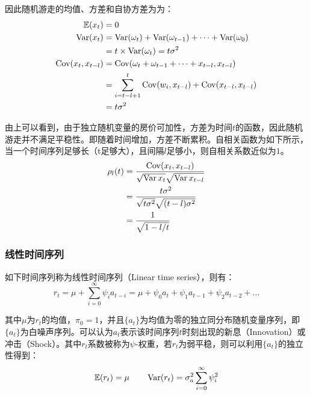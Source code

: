 \documentclass[11pt]{article}
\begin{document}
因此随机游走的均值、方差和自协方差为为：
\begin{align*}
    \mathbb{E}(x_t) &= 0 \\
    \operatorname{Var}(x_t) &= \operatorname{Var}(\omega_{t}) + \operatorname{Var}(\omega_{t-1}) + \dots + \operatorname{Var}(\omega_{0}) \\
    &= t \times \operatorname{Var}(\omega_t) = t \sigma^2 \\
    \operatorname{Cov}(x_t,x_{t-l}) &= \operatorname{Cov}(\omega_{t}+ \omega_{t-1} + \dots + x_{t-l},x_{t-l}) \\
    &= \sum_{i=t-l+1}^{t} \operatorname{Cov}(w_i,x_{t-l}) + \operatorname{Cov}(x_{t-l},x_{t-l}) \\
    &= t\sigma^2
\end{align*}

由上可以看到，由于独立随机变量的房价可加性，方差为时间$t$的函数，因此随机游走并不满足平稳性。即随着时间增加，方差不断累积。自相关函数为如下所示，当一个时间序列足够长（t足够大），且间隔$l$足够小，则自相关系数近似为$1$。
\begin{align*}
    \rho_l(t) &= \frac{\operatorname{Cov}(x_{t},x_{t-l})}{\sqrt{\operatorname{Var}{x_{t}}}\sqrt{\operatorname{Var}{x_{t-l}}}} \\
    &= \frac{t\sigma^2}{\sqrt{t\sigma^2}\sqrt{(t-l)\sigma^2}} \\
    &= \frac{1}{\sqrt{1-l/t}}
\end{align*}

\subsubsection{线性时间序列}

如下时间序列称为线性时间序列（Linear time series），则有：
\begin{equation*}
    r_t = \mu + \sum_{i=0}^{\infty} \psi_i a_{t-i} = \mu + \psi_0 a_{t} + \psi_1 a_{t-1} + \psi_2 a_{t-2} + \dots
\end{equation*}

其中$\mu$为$r_t$的均值，$\pi_0=1$，并且$\{a_t\}$为均值为零的独立同分布随机变量序列，即$\{a_t\}$为白噪声序列。可以认为$a_t$表示该时间序列$t$时刻出现的新息（Innovation）或冲击（Shock）。其中$r_t$系数被称为$\psi$-权重，若$r_t$为弱平稳，则可以利用$\{a_t\}$的独立性得到：
\begin{equation*}
    \mathbb{E}(r_t) = \mu \qquad \operatorname{Var}(r_t) = \sigma_{a}^{2}\sum_{i=0}^{\infty} \psi_{i}^{2}
\end{equation*}
\end{document}
